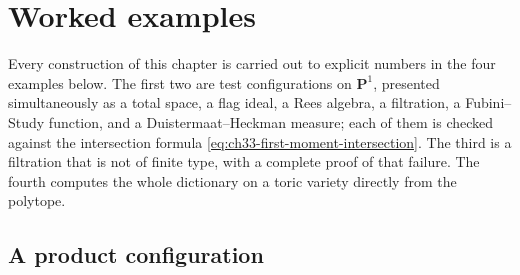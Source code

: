 \section{Worked examples}
\label{sec:ch33-examples}

Every construction of this chapter is carried out to explicit numbers in the
four examples below.  The first two are test configurations on
$\mathbf P^1$, presented simultaneously as a total space, a flag ideal, a
Rees algebra, a filtration, a Fubini--Study function, and a
Duistermaat--Heckman measure; each of them is checked against the
intersection formula \eqref{eq:ch33-first-moment-intersection}.  The third is
a filtration that is not of finite type, with a complete proof of that
failure.  The fourth computes the whole dictionary on a toric variety
directly from the polytope.

\subsection{A product configuration}
\label{sec:ch33-example-product}

